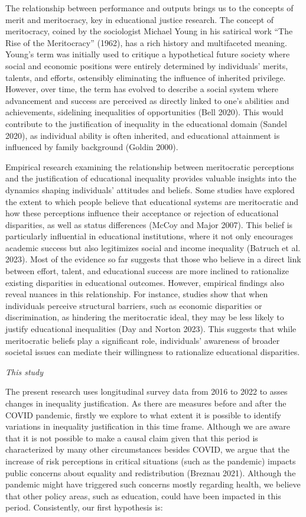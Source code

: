 \documentclass[
]{article}
\begin{document}
The relationship between performance and outputs brings us to the
concepts of merit and meritocracy, key in educational justice research.
The concept of meritocracy, coined by the sociologist Michael Young in
his satirical work ``The Rise of the Meritocracy'' (1962), has a rich
history and multifaceted meaning. Young's term was initially used to
critique a hypothetical future society where social and economic
positions were entirely determined by individuals' merits, talents, and
efforts, ostensibly eliminating the influence of inherited privilege.
However, over time, the term has evolved to describe a social system
where advancement and success are perceived as directly linked to one's
abilities and achievements, sidelining inequalities of opportunities
(Bell 2020). This would contribute to the justification of inequality in
the educational domain (Sandel 2020), as individual ability is often
inherited, and educational attainment is influenced by family background
(Goldin 2000).

Empirical research examining the relationship between meritocratic
perceptions and the justification of educational inequality provides
valuable insights into the dynamics shaping individuals' attitudes and
beliefs. Some studies have explored the extent to which people believe
that educational systems are meritocratic and how these perceptions
influence their acceptance or rejection of educational disparities, as
well as status differences (McCoy and Major 2007). This belief is
particularly influential in educational institutions, where it not only
encourages academic success but also legitimizes social and income
inequality (Batruch et al. 2023). Most of the evidence so far suggests
that those who believe in a direct link between effort, talent, and
educational success are more inclined to rationalize existing
disparities in educational outcomes. However, empirical findings also
reveal nuances in this relationship. For instance, studies show that
when individuals perceive structural barriers, such as economic
disparities or discrimination, as hindering the meritocratic ideal, they
may be less likely to justify educational inequalities (Day and Norton
2023). This suggests that while meritocratic beliefs play a significant
role, individuals' awareness of broader societal issues can mediate
their willingness to rationalize educational disparities.

\emph{This study}

The present research uses longitudinal survey data from 2016 to 2022 to
asses changes in inequality justification. As there are measures before
and after the COVID pandemic, firstly we explore to what extent it is
possible to identify variations in inequality justification in this time
frame. Although we are aware that it is not possible to make a causal
claim given that this period is characterized by many other
circumstances besides COVID, we argue that the increase of risk
perceptions in critical situations (such as the pandemic) impacts public
concerns about equality and redistribution (Breznau 2021). Although the
pandemic might have triggered such concerns mostly regarding health, we
believe that other policy areas, such as education, could have been
impacted in this period. Consistently, our first hypothesis is:
\end{document}

